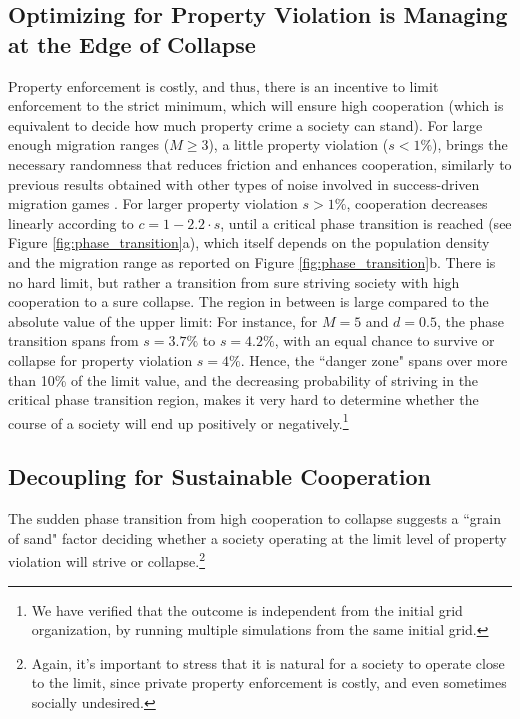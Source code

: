 
\subsection*{Optimizing for Property Violation is Managing at the Edge of Collapse}
Property enforcement is costly, and thus, there is an incentive to limit enforcement to the strict minimum, which will ensure high cooperation (which is equivalent to decide how much property crime a society can stand). For large enough migration ranges ($M\geqslant 3$), a little property violation ($s < 1 \%$), brings the necessary randomness that reduces friction and enhances cooperation, similarly to previous results obtained with other types of noise involved in success-driven migration games \cite{helbing2009outbreak}. For larger property violation $s > 1\%$, cooperation decreases linearly according to $ c = 1 - 2.2\cdot s$, until a critical phase transition is reached (see Figure \ref{fig:phase_transition}a), which itself depends on the population density and the migration range as reported on Figure \ref{fig:phase_transition}b. There is no hard limit, but rather a transition from sure striving society with high cooperation to a sure collapse. The region in between is large compared to the absolute value of the upper limit: For instance, for $M=5$ and $d=0.5$, the phase transition spans from $s = 3.7\%$ to $s= 4.2\%$, with an equal chance to survive or collapse for property violation $s=4\%$. Hence, the ``danger zone" spans over more than 10\% of the limit value, and the decreasing probability of striving in the critical phase transition region, makes it very hard to determine whether the course of a society will end up positively or negatively.\footnote{We have verified that the outcome is independent from the initial grid organization, by running multiple simulations from the same initial grid.}

\subsection*{Decoupling for Sustainable Cooperation}
The sudden phase transition from high cooperation to collapse suggests a ``grain of sand" factor deciding whether a society operating at the limit level of property violation will strive or collapse.\footnote{Again, it's important to stress that it is natural for a society to operate close to the limit, since private property enforcement is costly, and even sometimes socially undesired.}\\

